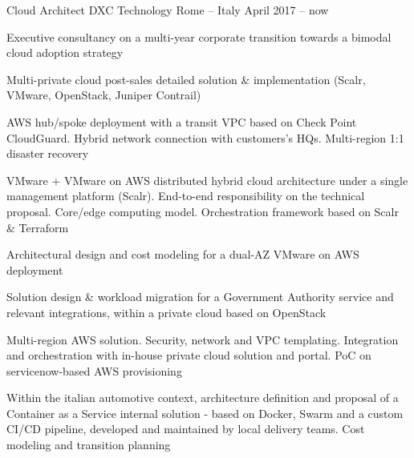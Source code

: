 
\begin{cventries}

  \cventry
    {Cloud Architect} %
    {DXC Technology} %
    {Rome -- Italy} %
    {April 2017 -- now} %
    {
      \begin{cvitems} %
        \item {Executive consultancy on a multi-year corporate transition towards a bimodal cloud adoption strategy}
        \item {Multi-private cloud post-sales detailed solution \& implementation (Scalr, VMware, OpenStack, Juniper Contrail)}
        \item {AWS hub/spoke deployment with a transit VPC based on Check Point CloudGuard. Hybrid network connection with customers's HQs. Multi-region 1:1 disaster recovery}
        \item {VMware + VMware on AWS distributed hybrid cloud architecture under a single management platform (Scalr). End-to-end responsibility on the technical proposal. Core/edge computing model. Orchestration framework based on Scalr \& Terraform}
        \item {Architectural design and cost modeling for a dual-AZ VMware on AWS deployment}
        \item {Solution design \& workload migration for a Government Authority service and relevant integrations, within a private cloud based on OpenStack}
        \item {Multi-region AWS solution. Security, network and VPC templating. Integration and orchestration with in-house private cloud solution and portal. PoC on servicenow-based AWS provisioning}
        \item {Within the italian automotive context, architecture definition and proposal of a Container as a Service internal solution - based on Docker, Swarm and a custom CI/CD pipeline, developed and maintained by local delivery teams. Cost modeling and transition planning}
      \end{cvitems}
    }


\end{cventries}

